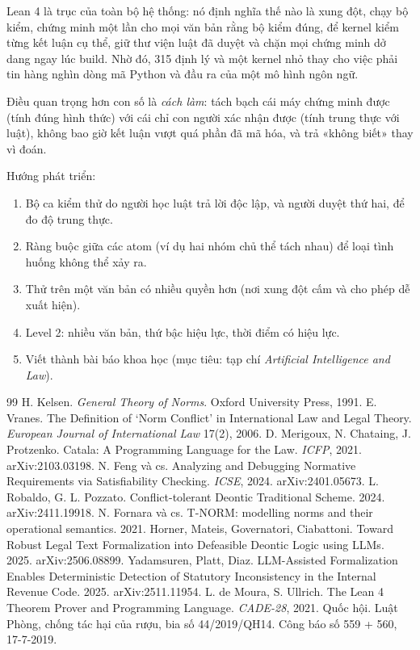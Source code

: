 \documentclass[12pt,a4paper]{article}
\begin{document}
Lean 4 là trục của toàn bộ hệ thống: nó định nghĩa thế nào là xung đột, chạy bộ kiểm, chứng minh một lần cho mọi văn bản rằng bộ
kiểm đúng, để kernel kiểm từng kết luận cụ thể, giữ thư viện luật đã duyệt và chặn mọi chứng minh dở dang ngay lúc build. Nhờ đó,
315 định lý và một kernel nhỏ thay cho việc phải tin hàng nghìn dòng mã Python và đầu ra của một mô hình ngôn ngữ.

Điều quan trọng hơn con số là \emph{cách làm}: tách bạch cái máy chứng minh được (tính đúng hình thức) với cái chỉ con người
xác nhận được (tính trung thực với luật), không bao giờ kết luận vượt quá phần đã mã hóa, và trả «không biết» thay vì đoán.

Hướng phát triển:
\begin{enumerate}
  \item Bộ ca kiểm thử do người học luật trả lời độc lập, và người duyệt thứ hai, để đo độ trung thực.
  \item Ràng buộc giữa các atom (ví dụ hai nhóm chủ thể tách nhau) để loại tình huống không thể xảy ra.
  \item Thử trên một văn bản có nhiều quyền hơn (nơi xung đột cấm và cho phép dễ xuất hiện).
  \item Level 2: nhiều văn bản, thứ bậc hiệu lực, thời điểm có hiệu lực.
  \item Viết thành bài báo khoa học (mục tiêu: tạp chí \emph{Artificial Intelligence and Law}).
\end{enumerate}

\begin{thebibliography}{99}\small
{} H. Kelsen. \emph{General Theory of Norms}. Oxford University Press, 1991.
 E. Vranes. The Definition of `Norm Conflict' in International Law and Legal Theory. \emph{European Journal of
International Law} 17(2), 2006.
 D. Merigoux, N. Chataing, J. Protzenko. Catala: A Programming Language for the Law. \emph{ICFP}, 2021.
arXiv:2103.03198.
 N. Feng và cs. Analyzing and Debugging Normative Requirements via Satisfiability Checking. \emph{ICSE},
2024. arXiv:2401.05673.
 L. Robaldo, G. L. Pozzato. Conflict-tolerant Deontic Traditional Scheme. 2024. arXiv:2411.19918.
 N. Fornara và cs. T-NORM: modelling norms and their operational semantics. 2021.
 Horner, Mateis, Governatori, Ciabattoni. Toward Robust Legal Text Formalization into Defeasible Deontic Logic
using LLMs. 2025. arXiv:2506.08899.
 Yadamsuren, Platt, Diaz. LLM-Assisted Formalization Enables Deterministic Detection of Statutory Inconsistency
in the Internal Revenue Code. 2025. arXiv:2511.11954.
 L. de Moura, S. Ullrich. The Lean 4 Theorem Prover and Programming Language. \emph{CADE-28}, 2021.
 Quốc hội. Luật Phòng, chống tác hại của rượu, bia số 44/2019/QH14. Công báo số 559 + 560, 17-7-2019.
\end{thebibliography}
\end{document}
